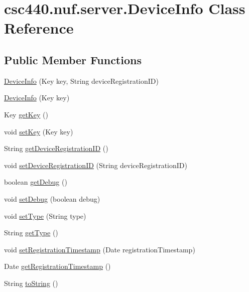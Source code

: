\hypertarget{classcsc440_1_1nuf_1_1server_1_1_device_info}{\section{csc440.\-nuf.\-server.\-Device\-Info Class Reference}
\label{classcsc440_1_1nuf_1_1server_1_1_device_info}
}
\subsection*{Public Member Functions}
\begin{DoxyCompactItemize}
\item 
\hyperlink{classcsc440_1_1nuf_1_1server_1_1_device_info_abebcf4568af54ade9145deef1379033f}{Device\-Info} (Key key, String device\-Registration\-I\-D)
\item 
\hyperlink{classcsc440_1_1nuf_1_1server_1_1_device_info_ad97a129642c65cd6ccc150f62720bd6f}{Device\-Info} (Key key)
\item 
Key \hyperlink{classcsc440_1_1nuf_1_1server_1_1_device_info_a10d351ee9254f7f63bd6b77c3005f33c}{get\-Key} ()
\item 
void \hyperlink{classcsc440_1_1nuf_1_1server_1_1_device_info_aa5e584cac75d8ec6a1c1d48c3db02829}{set\-Key} (Key key)
\item 
String \hyperlink{classcsc440_1_1nuf_1_1server_1_1_device_info_a09635fb3f7c88f9f440491adad27517c}{get\-Device\-Registration\-I\-D} ()
\item 
void \hyperlink{classcsc440_1_1nuf_1_1server_1_1_device_info_accf76fe6cb3bae22ea8993e9953dd6d5}{set\-Device\-Registration\-I\-D} (String device\-Registration\-I\-D)
\item 
boolean \hyperlink{classcsc440_1_1nuf_1_1server_1_1_device_info_ac2441b49b7a4d54c481ae68afeccda2d}{get\-Debug} ()
\item 
void \hyperlink{classcsc440_1_1nuf_1_1server_1_1_device_info_ad52d926f4379fc7f1801928a15c80f66}{set\-Debug} (boolean debug)
\item 
void \hyperlink{classcsc440_1_1nuf_1_1server_1_1_device_info_a9925ea2454675718ab863fb23a6900e6}{set\-Type} (String type)
\item 
String \hyperlink{classcsc440_1_1nuf_1_1server_1_1_device_info_a8b52bee034de79eb4ec16e67e60a2d04}{get\-Type} ()
\item 
void \hyperlink{classcsc440_1_1nuf_1_1server_1_1_device_info_a9da41b1af89038902b419b584cbfb56e}{set\-Registration\-Timestamp} (Date registration\-Timestamp)
\item 
Date \hyperlink{classcsc440_1_1nuf_1_1server_1_1_device_info_a947fcd68b2cb0308afb40194a66326a0}{get\-Registration\-Timestamp} ()
\item 
String \hyperlink{classcsc440_1_1nuf_1_1server_1_1_device_info_ae1c3a4ef43b8a4433e52eff1443c7309}{to\-String} ()
\end{DoxyCompactItemize}
